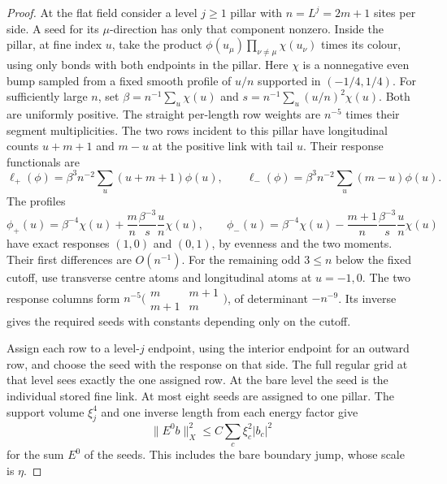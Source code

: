\documentclass[11pt,letterpaper,reqno]{amsart}
\numberwithin{equation}{section}
\theoremstyle{definition}
\theoremstyle{remark}
\begin{document}
\begin{proof}
At the flat field consider a level \(j\ge1\) pillar with
\(n=L^j=2m+1\) sites per side. A seed for its \(\mu\)-direction
has only that component nonzero. Inside the pillar, at fine
index \(u\), take the product
\(\phi(u_\mu)\prod_{\nu\ne\mu}\chi(u_\nu)\) times its colour,
using only bonds with both endpoints in the pillar.
Here \(\chi\) is a nonnegative even bump sampled from a fixed
smooth profile of \(u/n\) supported in \((-1/4,1/4)\).
For sufficiently large \(n\), set
\(\beta=n^{-1}\sum_u\chi(u)\) and
\(s=n^{-1}\sum_u(u/n)^2\chi(u)\). Both are uniformly positive.
The straight per-length row weights are \(n^{-5}\)
times their segment multiplicities. The two rows incident
to this pillar have longitudinal counts \(u+m+1\) and
\(m-u\) at the positive link with tail \(u\). Their
response functionals are
\[
 \ell_+(\phi)=\beta^3n^{-2}\sum_u(u+m+1)\phi(u),\qquad
 \ell_-(\phi)=\beta^3n^{-2}\sum_u(m-u)\phi(u).
\]
The profiles
\[
 \phi_+(u)=\beta^{-4}\chi(u)+
       \frac m n\frac{\beta^{-3}}s\frac u n\chi(u),\qquad
 \phi_-(u)=\beta^{-4}\chi(u)-
       \frac{m+1}n\frac{\beta^{-3}}s\frac u n\chi(u)
\]
have exact responses \((1,0)\) and \((0,1)\), by evenness
and the two moments. Their first differences are \(O(n^{-1})\).
For the remaining odd \(3\le n\) below the fixed cutoff,
use transverse centre atoms and longitudinal atoms at
\(u=-1,0\). The two response columns form
\(n^{-5}\bigl(\begin{smallmatrix}m&m+1\\m+1&m\end{smallmatrix}\bigr)\),
of determinant \(-n^{-9}\). Its inverse gives the required
seeds with constants depending only on the cutoff.

Assign each row to a level-\(j\) endpoint, using the
interior endpoint for an outward row, and choose the seed
with the response on that side. The full regular grid at
that level sees exactly the one assigned row. At the bare
level the seed is the individual stored fine link.
At most eight seeds are assigned to one pillar. The support
volume \(\xi_j^4\) and one inverse length from each energy
factor give
\[
                   \|E^0b\|_X^2\le C\sum_c\xi_c^2|b_c|^2
\]
for the sum \(E^0\) of the seeds. This includes the bare
boundary jump, whose scale is \(\eta\).


\end{proof}
\end{document}
